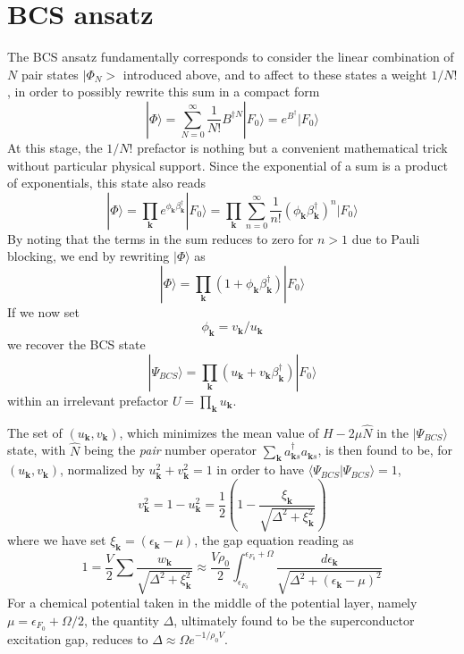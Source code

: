 \documentclass[aps,prb,preprint,groupedaddress,amsmath]{revtex4}
\newcommand{\vk}{\ensuremath{\mathbf{k}}}
\newcommand{\dg}{\ensuremath{\dagger}}
\begin{document}
\section{BCS  ansatz\label{sec:bcs}}
The BCS ansatz fundamentally corresponds to consider the linear combination of $N$ pair states $|\Phi_N>$ introduced above, and to affect to these states a weight $1/N!$, in order to possibly rewrite this sum in a compact form
\begin{equation}
|\Phi{\rangle}=\sum^\infty_{N=0}\frac{1}{N!}B^{\dg{}N}|F_0{\rangle}=e^{B^\dg}|F_0{\rangle}
\label{eq:BcsPhi}
\end{equation}
At this stage, the $1/N!$ prefactor is nothing but  a convenient mathematical trick without particular physical support. Since the exponential of a sum is a product of exponentials, this state also reads 
\begin{equation}
|\Phi{\rangle}=\prod_\vk{}e^{\phi_\vk\beta^\dg_\vk}|F_0{\rangle}=\prod_\vk{}\sum_{n=0}^\infty\frac{1}{n!}({\phi_\vk\beta^\dg_\vk})^n|F_0{\rangle}
\label{eq:BcsPhi2}
\end{equation}
By noting that the terms in the sum reduces to zero for $n>1$ due to Pauli blocking, we end by rewriting $|\Phi\rangle$ as 
\begin{equation}
|\Phi{\rangle}=\prod_\vk{}({1+\phi_\vk\beta^\dg_\vk})|F_0{\rangle}
\label{eq:BcsPhi3}
\end{equation}
If we now set 
\begin{equation}\label{eq:phiUv}
\phi_\vk=v_\vk/u_\vk
\end{equation}
 we recover the  BCS state
\begin{equation}
|\Psi_{BCS}{\rangle}=\prod_\vk{}({u_\vk+v_\vk\beta^\dg_\vk})|F_0{\rangle}
\label{eq:Bcs1}
\end{equation}
within an irrelevant prefactor $U=\prod_\vk{u_\vk}$.  

The set of $(u_\vk,v_\vk)$,  which minimizes the mean value of   $H-2\mu\hat{N}$ in the $|\Psi_{BCS}\rangle$ state, with $\hat{N}$ being the \emph{pair} number operator $\sum_\vk{}a^\dg_{\vk{}s}a^{}_{\vk{}s}$,  is then found to be, for   $(u_\vk,v_\vk)$, normalized by $u_\vk^2+v_\vk^2=1$ in order to have $\langle\Psi_{BCS}|\Psi_{BCS}\rangle=1$,
\begin{equation}\label{eq:v}
v^2_\vk=1-u_\vk^2=\frac{1}{2}\left(1-\frac{\xi_\vk}{\sqrt{\Delta^2+\xi_\vk^2}}\right)
\end{equation}
where we have set $\xi_\vk=(\epsilon_\vk-\mu)$, the gap equation reading as
\begin{equation}
1=\frac{V}{2}\sum\frac{w_\vk}{\sqrt{\Delta^2+\xi_\vk^2}}\approx%
	\frac{V\rho_0}{2}\int_{\epsilon_{F_0}}^{\epsilon_{F_0}+\Omega}%
	\frac{d\epsilon_\vk}{\sqrt{\Delta^2+(\epsilon_\vk-\mu)^2}}
\end{equation}
For a chemical potential taken in the middle of the potential layer, namely $\mu=\epsilon_{F_0}+\Omega/2$, the quantity $\Delta$, ultimately found to be the superconductor excitation gap, reduces to  $\Delta\approx\Omega{}e^{-1/\rho_0V}$.
\end{document}

